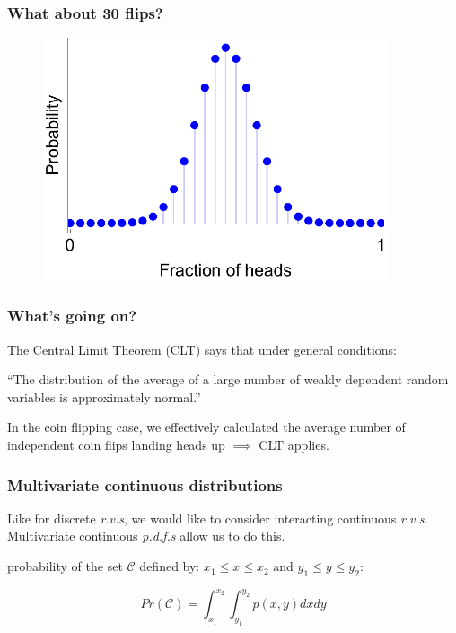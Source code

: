 \documentclass{beamer}
\begin{document}
	\begin{frame}
		\frametitle{What about 30 flips?}
		
		\begin{figure}[ht]
			\centerline{\includegraphics[width=0.9\textwidth]{./figures/binomial_30.pdf}}
		\end{figure}
		
	\end{frame}
	
	\begin{frame}
		\frametitle{What's going on?}
		The Central Limit Theorem (CLT) says that under general conditions:
		
		\vspace{0.5cm}
		
		``The distribution of the average of a large number of weakly dependent random variables is approximately normal.''
		
		\vspace{0.5cm}
		
		In the coin flipping case, we effectively calculated the average number of independent coin flips landing heads up $\implies$ CLT applies.
		
	\end{frame}
	
	\begin{frame}
		\frametitle{Multivariate continuous distributions}
		
		Like for discrete \textit{r.v.s}, we would like to consider interacting continuous \textit{r.v.s}. Multivariate continuous \textit{p.d.f.s} allow us to do this.
		
		\vspace{0.5cm}
		
		probability of the set $\mathcal{C}$ defined by: $x_1 \leq x \leq x_2$ and $y_1 \leq y \leq y_2$: 
		
		\begin{equation}
		 Pr(\mathcal{C}) = \int_{x_1}^{x_2}\int_{y_1}^{y_2} p(x, y)dx dy
		\end{equation}
		
	\end{frame}
	
\end{document}
